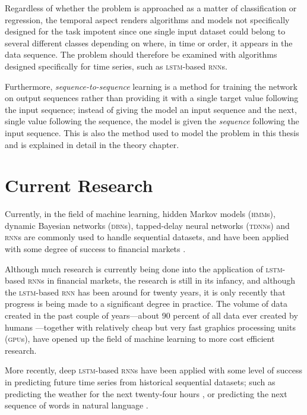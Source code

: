 \begin{multicols}{2}
Regardless of whether the problem is approached as a matter of classification or
regression, the temporal aspect renders algorithms and models not specifically
designed for the task impotent since one single input dataset could belong to
several different classes depending on where, in time or order, it appears in
the data sequence.  The problem should therefore be examined with algorithms
designed specifically for time series, such as \textsc{lstm}-based
\textsc{rnn}s.

Furthermore, \textit{sequence-to-sequence} learning is a method for training the
network on output sequences rather than providing it with a single target value
following the input sequence; instead of giving the model an input sequence and
the next, single value following the sequence, the model is given the
\textit{sequence} following the input sequence.  This is also the method used to
model the problem in this thesis and is explained in detail in the theory
chapter.

\section{Current Research}

Currently, in the field of machine learning, hidden Markov models
(\textsc{hmm}s), dynamic Bayesian networks (\textsc{dbn}s), tapped-delay neural
networks (\textsc{tdnn}s) and \textsc{rnn}s are commonly used to handle
sequential datasets, and have been applied with some degree of success to
financial markets \citep{saad1998,kita2012,zhang2004}.

Although much research is currently being done into the application of
\textsc{lstm}-based \textsc{rnn}s in financial markets, the research is still in
its infancy, and although the \textsc{lstm}-based \textsc{rnn} has been around
for twenty years, it is only recently that progress is being made to a
significant degree in practice.  The volume of data created in the past couple
of years---about 90 percent of all data ever created by humans
\citep{devakunchari2014}---together with relatively cheap but very fast graphics
processing units (\textsc{gpu}s), have opened up the field of machine learning
to more cost efficient research.

More recently, deep \textsc{lstm}-based \textsc{rnn}s have been applied with
some level of success in predicting future time series from historical
sequential datasets; such as predicting the weather for the next twenty-four
hours \citep{zaytar2016}, or predicting the next sequence of words in natural
language \citep{sutskever2014sequence}.


\end{multicols}
